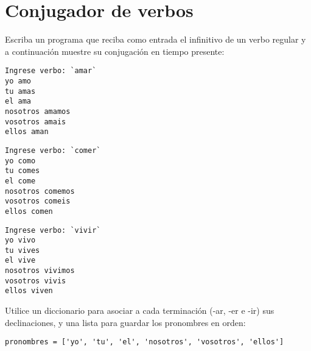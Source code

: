 \section{Conjugador de verbos}

Escriba un programa que reciba como entrada el infinitivo de un verbo
regular y a continuación muestre su conjugación en tiempo presente:

\begin{lstlisting}[language=testcase]
Ingrese verbo: `amar`
yo amo
tu amas
el ama
nosotros amamos
vosotros amais
ellos aman
\end{lstlisting}

\begin{lstlisting}[language=testcase]
Ingrese verbo: `comer`
yo como
tu comes
el come
nosotros comemos
vosotros comeis
ellos comen
\end{lstlisting}

\begin{lstlisting}[language=testcase]
Ingrese verbo: `vivir`
yo vivo
tu vives
el vive
nosotros vivimos
vosotros vivis
ellos viven
\end{lstlisting}

Utilice un diccionario para asociar a cada terminación (-ar, -er e -ir)
sus declinaciones, y una lista para guardar los pronombres en orden:
\begin{lstlisting}
pronombres = ['yo', 'tu', 'el', 'nosotros', 'vosotros', 'ellos']
\end{lstlisting}

